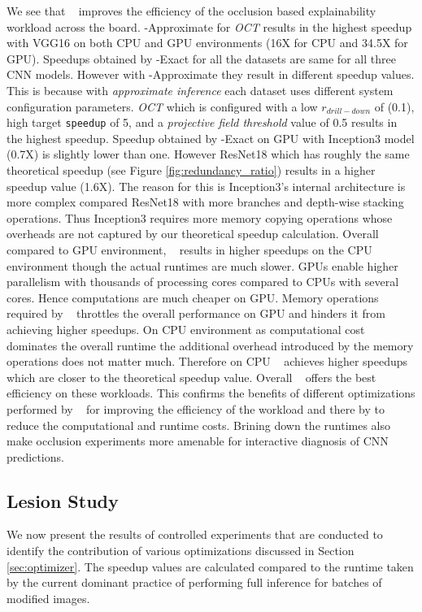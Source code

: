 We see that \system~ improves the efficiency of the occlusion based explainability workload across the board.
\system-Approximate for \textit{OCT} results in the highest speedup with VGG16 on both CPU and GPU environments (16X for CPU and 34.5X for GPU).
Speedups obtained by \system-Exact for all the datasets are same for all three CNN models.
However with \system-Approximate they result in different speedup values.
This is because with \textit{approximate inference} each dataset uses different system configuration parameters.
\textit{OCT} which is configured with a low $r_{drill-down}$ of (0.1), high target \texttt{speedup} of 5, and a \textit{projective field threshold} value of 0.5 results in the highest speedup.
Speedup obtained by \system-Exact on GPU with Inception3 model (0.7X) is slightly lower than one.
However ResNet18 which has roughly the same theoretical speedup (see Figure \ref{fig:redundancy_ratio}) results in a higher speedup value (1.6X).
The reason for this is Inception3's internal architecture is more complex compared ResNet18 with more branches and depth-wise stacking operations.
Thus Inception3 requires more memory copying operations whose overheads are not captured by our theoretical speedup calculation.
Overall compared to GPU environment, \system~ results in higher speedups on the CPU environment though the actual runtimes are much slower.
GPUs enable higher parallelism with thousands of processing cores compared to CPUs with several cores.
Hence computations are much cheaper on GPU.
Memory operations required by \system~ throttles the overall performance on GPU and hinders it from achieving higher speedups.
On CPU environment as computational cost dominates the overall runtime the additional overhead introduced by the memory operations does not matter much.
Therefore on CPU \system~ achieves higher speedups which are closer to the theoretical speedup value.
Overall \system~ offers the best efficiency on these workloads.
This confirms the benefits of different optimizations performed by \system~ for improving the efficiency of the workload and there by to reduce the computational and runtime costs.
Brining down the runtimes also make occlusion experiments more amenable for interactive diagnosis of CNN predictions.


\subsection{Lesion Study}
We now present the results of controlled experiments that are conducted to identify the contribution of various optimizations discussed in Section \ref{sec:optimizer}.
The speedup values are calculated compared to the runtime taken by the current dominant practice of performing full inference for batches of modified images.


